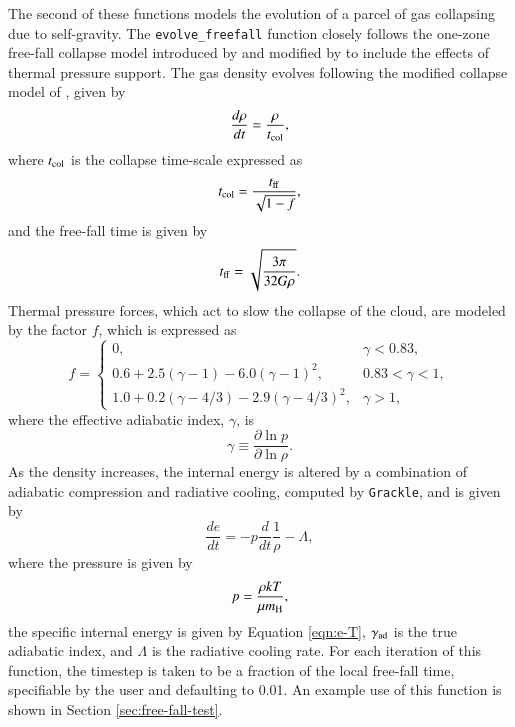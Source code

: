 The second of these functions models the evolution of a parcel of gas
collapsing due to self-gravity.  The \texttt{evolve\_freefall} function
closely follows the one-zone free-fall collapse model introduced by
\citet{2000ApJ...534..809O} and modified by
\citet{2005ApJ...626..627O} to include the effects of thermal pressure
support.  The gas density evolves following the modified collapse
model of \citet{2005ApJ...626..627O}, given by
\begin{equation}
\frac{d \rho}{dt} = \frac{\rho}{t_{\rm col}},
\end{equation}
where $t_{\rm col}$ is the collapse time-scale expressed as
\begin{equation}
t_{\rm col} = \frac{t_{\rm ff}}{\sqrt{1-f}},
\end{equation}
and the free-fall time is given by
\begin{equation}
t_{\rm ff} = \sqrt{\frac{3 \pi}{32 G \rho}}.
\end{equation}
Thermal pressure forces, which act to slow the collapse of the cloud,
are modeled by the factor $f$, which is expressed as
\begin{equation}
f = \left\{
\begin{array}{lr}
0, & \gamma < 0.83,\\
0.6 + 2.5(\gamma - 1) - 6.0(\gamma - 1)^2, & 0.83 < \gamma < 1,\\
1.0 + 0.2(\gamma - 4/3) - 2.9(\gamma - 4/3)^2, & \gamma > 1,
\end{array}
 \right.
\end{equation}
where the effective adiabatic index, $\gamma$, is
\begin{equation}
\gamma \equiv \frac{\partial \ln p}{\partial \ln \rho}.
\end{equation}
As the density increases, the internal energy is altered by a
combination of adiabatic compression and radiative cooling, computed
by \texttt{Grackle}, and is given by
\begin{equation}
\frac{de}{dt}= -p \frac{d}{dt} \frac{1}{\rho} - {\Lambda},
\label{eq:energy}
\end{equation}
where the pressure is given by
\begin{equation}
p = \frac{\rho k T}{\mu m_{\rm H}},
\end{equation}
the specific internal energy is given by Equation \ref{eqn:e-T},
$\gamma_{\rm ad}$ is the true adiabatic index, and $\Lambda$ is the
radiative cooling rate.  For each iteration of this function, the
timestep is taken to be a fraction of the local free-fall time,
specifiable by the user and defaulting to 0.01.  An example use of
this function is shown in Section \ref{sec:free-fall-test}.

